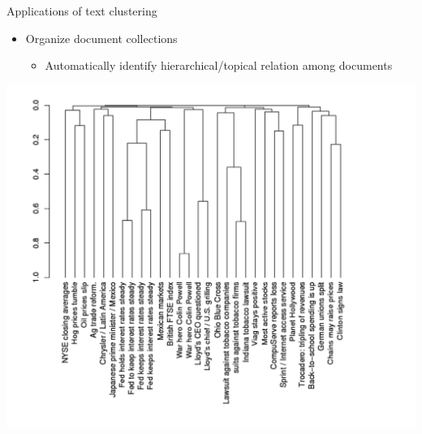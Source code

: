 \documentclass[
  ignorenonframetext,
]{beamer}
\providecommand{\tightlist}{%
  \setlength{\itemsep}{0pt}\setlength{\parskip}{0pt}}
\begin{document}
\begin{frame}{Applications of text clustering}
\protect\hypertarget{applications-of-text-clustering}{}
\begin{itemize}
\item
  Organize document collections

  \begin{itemize}
  \tightlist
  \item
    Automatically identify hierarchical/topical relation among documents
  \end{itemize}
\end{itemize}

\includegraphics[width=1\linewidth]{img/page 7}
\end{frame}
\end{document}
